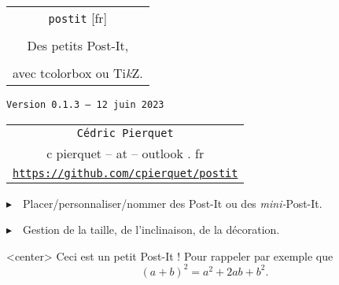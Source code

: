 \documentclass[french,a4paper,11pt]{article}
\def\TPversion{0.1.3}
\def\TPdate{12 juin 2023}
\begin{document}
\setlength{\aweboxleftmargin}{0.07\linewidth}
\setlength{\aweboxcontentwidth}{0.93\linewidth}
\setlength{\aweboxvskip}{8pt}

\pagestyle{fancy}

\thispagestyle{empty}

\vspace{2cm}

\begin{center}
	\begin{minipage}{0.75\linewidth}
	\begin{tcolorbox}[colframe=yellow,colback=yellow!15]
		\begin{center}
			\begin{tabular}{c}
				{\Huge \texttt{postit} [fr]}\\
				\\
				{\LARGE Des petits Post-It,} \\
				\\
				{\LARGE avec \textsf{tcolorbox} ou \textsf{Ti\textit{k}Z}.} \\
			\end{tabular}
			
			\bigskip
			
			{\small \texttt{Version \TPversion{} -- \TPdate}}
		\end{center}
	\end{tcolorbox}
\end{minipage}
\end{center}

\begin{center}
	\begin{tabular}{c}
	\texttt{Cédric Pierquet}\\
	{\ttfamily c pierquet -- at -- outlook . fr}\\
	\texttt{\url{https://github.com/cpierquet/postit}}
\end{tabular}
\end{center}

\vspace{0.25cm}

{$\blacktriangleright$~~Placer/personnaliser/nommer des Post-It ou des \textit{mini-}Post-It.}

\vspace{0.25cm}

{$\blacktriangleright$~~Gestion de la taille, de l'inclinaison, de la décoration.}

\vspace{1cm}

\begin{PostIt}[RappelPostIt=PI1]<center>
	Ceci est un petit Post-It ! Pour rappeler par exemple que \[(a+b)^2=a^2+2ab+b^2.\]
\end{PostIt}
\end{document}

